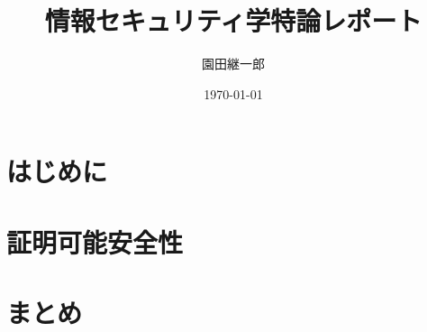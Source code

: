 \documentclass[a4paper,11pt]{jsarticle}
\begin{document}
\title{情報セキュリティ学特論レポート}
\author{園田継一郎}
\date{\today}
\maketitle

\section{はじめに}

\section{証明可能安全性}

\section{まとめ}
\end{document}
